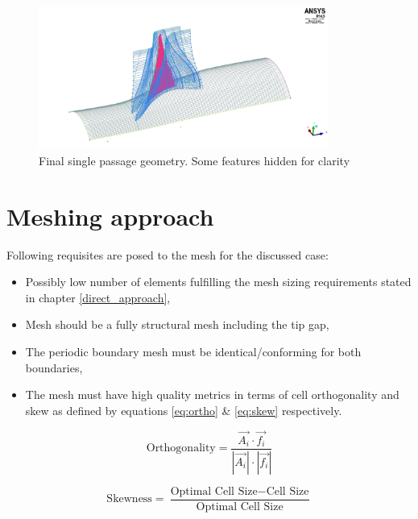 \begin{figure}[h!]
\centering %
\includegraphics[width=0.85\textwidth]{Pictures/r67_geom.jpg}
\caption{Final single passage geometry. Some features hidden for clarity}
\label{geom_final}
\end{figure}

\section{Meshing approach} \label{mesh}
Following requisites are posed to the mesh for the discussed case:
\begin{itemize}
\item Possibly low number of elements fulfilling the mesh sizing requirements stated in chapter \ref{direct_approach},
\item Mesh should be a fully structural mesh including the tip gap,
\item The periodic boundary mesh must be identical/conforming for both boundaries,
\item The mesh must have high quality metrics in terms of cell orthogonality and skew as defined by equations \ref{eq:ortho} \& \ref{eq:skew} respectively.
\end{itemize}


\begin{equation} \label{eq:ortho}
\text{Orthogonality} = \frac{\vec{A_i} \cdot \vec{f_i}}{|\vec{A_i}| \cdot |\vec{f_i}|}
\end{equation}


\begin{equation} \label{eq:skew}
\text{Skewness} = \frac{\text{Optimal Cell Size} - \text{Cell Size}}{\text{Optimal Cell Size}}
\end{equation}

